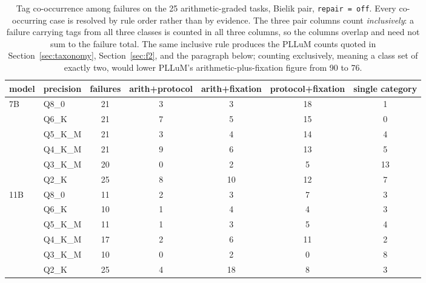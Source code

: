 \documentclass[11pt]{article}
\begin{document}
\begin{table}[h]
\centering\small
\caption{Tag co-occurrence among failures on the 25 arithmetic-graded tasks, Bielik pair, \texttt{repair\,=\,off}. Every co-occurring case is resolved by rule order rather than by evidence. The three pair columns count \emph{inclusively}: a failure carrying tags from all three classes is counted in all three columns, so the columns overlap and need not sum to the failure total. The same inclusive rule produces the PLLuM counts quoted in Section~\ref{sec:taxonomy}, Section~\ref{sec:f2}, and the paragraph below; counting exclusively, meaning a class set of exactly two, would lower PLLuM's arithmetic-plus-fixation figure from 90 to 76.}
\label{tab:cooc}
\begin{tabular}{llccccc}
\toprule
model & precision & failures & arith+protocol & arith+fixation & protocol+fixation & single category \\
\midrule
\multirow{6}{*}{7B}
 & Q8\_0   & 21 & 3 & 3  & 18 & 1 \\
 & Q6\_K   & 21 & 7 & 5  & 15 & 0 \\
 & Q5\_K\_M & 21 & 3 & 4  & 14 & 4 \\
 & Q4\_K\_M & 21 & 9 & 6  & 13 & 5 \\
 & Q3\_K\_M & 20 & 0 & 2  & 5  & 13 \\
 & Q2\_K   & 25 & 8 & 10 & 12 & 7 \\
\midrule
\multirow{6}{*}{11B}
 & Q8\_0   & 11 & 2 & 3  & 7  & 3 \\
 & Q6\_K   & 10 & 1 & 4  & 4  & 3 \\
 & Q5\_K\_M & 11 & 1 & 3  & 5  & 4 \\
 & Q4\_K\_M & 17 & 2 & 6  & 11 & 2 \\
 & Q3\_K\_M & 10 & 0 & 2  & 0  & 8 \\
 & Q2\_K   & 25 & 4 & 18 & 8  & 3 \\
\bottomrule
\end{tabular}
\end{table}
\end{document}
